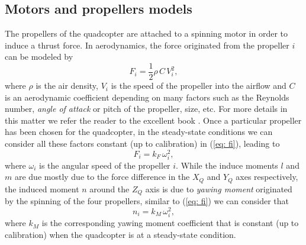 \documentclass[a4paper, onecolumn]{ieeeconf}
\begin{document}
\subsection{Motors and propellers models}
The propellers of the quadcopter are attached to a spinning motor in order to induce a thrust force. In aerodynamics, the force originated from the propeller $i$ can be modeled by
\begin{equation}
	F_i = \frac{1}{2}\rho \, C \, V_i^2 ,
	\label{eq: fi}
\end{equation}
where $\rho$ is the air density, $V_i$ is the speed of the propeller into the airflow and $C$ is an aerodynamic coefficient depending on many factors such as the Reynolds number, \emph{angle of attack} or pitch of the propeller, size, etc. For more details in this matter we refer the reader to the excellent book \cite{anderson1985fundamentals}. Once a particular propeller has been chosen for the quadcopter, in the steady-state conditions we can consider all these factors constant (up to calibration) in (\ref{eq: fi}), leading to
\begin{equation}
F_i = k_F \, \omega_i^2,
\label{eq: fi2}
\end{equation}
where $\omega_i$ is the angular speed of the propeller $i$. While the induce moments $l$ and $m$ are due mostly due to the force difference in the $X_Q$ and $Y_Q$ axes respectively, the induced moment $n$ around the $Z_Q$ axis is due to \emph{yawing moment} originated by the spinning of the four propellers, similar to (\ref{eq: fi}) we can consider that
\begin{equation}
n_i = k_M \, \omega_i^2,
\end{equation}
where $k_M$ is the corresponding yawing moment coefficient that is constant (up to calibration) when the quadcopter is at a steady-state condition.
\end{document}
